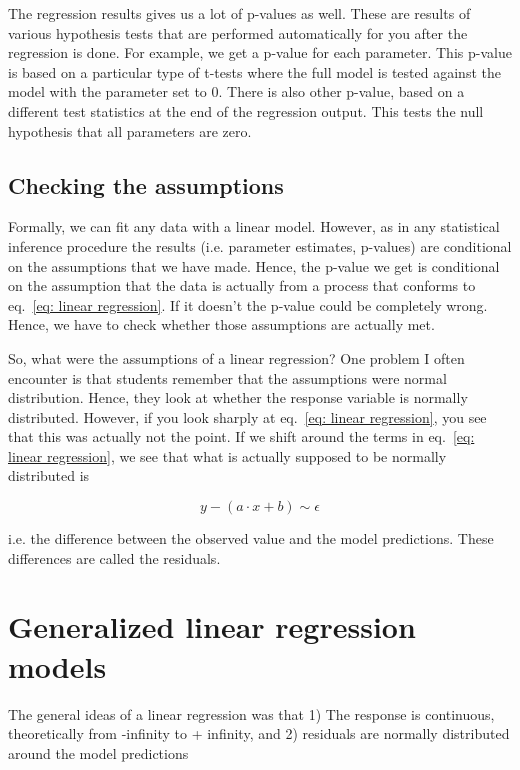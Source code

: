 \documentclass[a4paper,twoside]{tufte-book} %
\begin{document}
The regression results gives us a lot of p-values as well. These are results of various hypothesis tests that are performed automatically for you after the regression is done. For example, we get a p-value for each parameter. This p-value is based on a particular type of t-tests where the full model is tested against the model with the parameter set to 0. There is also other p-value, based on a different test statistics at the end of the regression output. This tests the null hypothesis that all parameters are zero.  


\subsection{Checking the assumptions}

Formally, we can fit any data with a linear model. However, as in any statistical inference procedure the results (i.e. parameter estimates, p-values) are conditional on the assumptions that we have made. Hence, the p-value we get is conditional on the assumption that the data is actually from a process that conforms to eq.~\ref{eq: linear regression}. If it doesn't the p-value could be completely wrong. Hence, we have to check whether those assumptions are actually met. 

So, what were the assumptions of a linear regression? One problem I often encounter is that students remember that the assumptions were normal distribution. Hence, they look at whether the response variable is normally distributed. However, if you look sharply at eq.~\ref{eq: linear regression}, you see that this was actually not the point. If we shift around the terms in eq.~\ref{eq: linear regression}, we see that what is actually supposed to be normally distributed is 

\begin{equation} \label{eq: linear regression}
y - (a \cdot x + b ) \sim \epsilon 
\end{equation}

i.e. the difference between the observed value and the model predictions. These differences are called the residuals.


\section{Generalized linear regression models}

The general ideas of a linear regression was that 1) The response is continuous, theoretically from -infinity to + infinity, and 2) residuals are normally distributed around the model predictions
\end{document}

